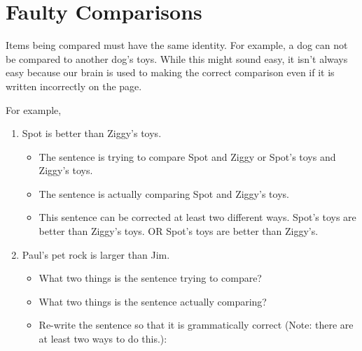 \section{Faulty Comparisons}

Items being compared must have the same identity. For example, a dog can not be compared to another dog's toys. While this might sound easy, it isn't always easy because our brain is used to making the correct comparison even if it is written incorrectly on the page.

For example,

\begin{enumerate}
\item Spot is better than Ziggy's toys.

\begin{itemize}
\item The sentence is trying to compare Spot and Ziggy or Spot's toys and Ziggy's toys.
\item The sentence is actually comparing Spot and Ziggy's toys.
\item This sentence can be corrected at least two different ways. Spot's toys are better
than Ziggy's toys. OR Spot's toys are better than Ziggy's.
\end{itemize}

\item Paul's pet rock is larger than Jim.

\begin{itemize}
\item What two things is the sentence trying to compare? \hrulefill
\item What two things is the sentence actually comparing? \hrulefill
\item Re-write the sentence so that it is grammatically correct (Note: there are at least two
ways to do this.): \hrulefill
\end{itemize}
\end{enumerate}
